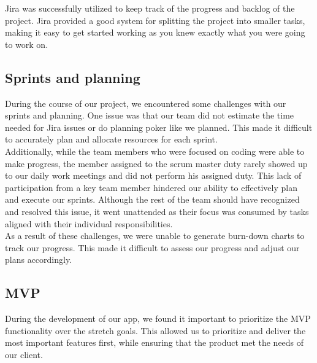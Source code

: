 Jira was successfully utilized to keep track of the progress and backlog of the project. Jira provided a good system for splitting the project into smaller tasks, making it easy to get started working as you knew exactly what you were going to work on. 

\subsection{Sprints and planning} 


\noindent
During the course of our project, we encountered some challenges with our sprints and planning. One issue was that our team did not estimate the time needed for Jira issues or do planning poker like we planned. This made it difficult to accurately plan and allocate resources for each sprint. \\

\noindent
Additionally, while the team members who were focused on coding were able to make progress, the member assigned to the scrum master duty rarely showed up to our daily work meetings and did not perform his assigned duty. This lack of participation from a key team member hindered our ability to effectively plan and execute our sprints. Although the rest of the team should have recognized and resolved this issue, it went unattended as their focus was consumed by tasks aligned with their individual responsibilities. \\

\noindent
As a result of these challenges, we were unable to generate burn-down charts to track our progress. This made it difficult to assess our progress and adjust our plans accordingly. \\

\subsection{MVP}

During the development of our app, we found it important to prioritize the MVP functionality over the stretch goals. This allowed us to prioritize and deliver the most important features first, while ensuring that the product met the needs of our client. 


